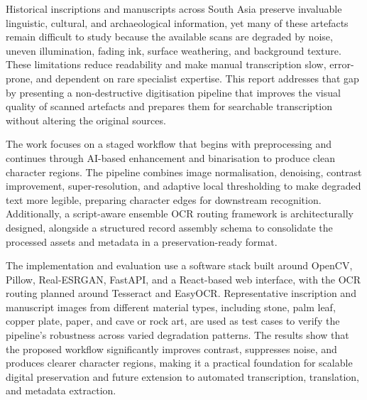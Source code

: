 \vspace{-1cm}


Historical inscriptions and manuscripts across South Asia preserve invaluable linguistic, cultural, and archaeological information, yet many of these artefacts remain difficult to study because the available scans are degraded by noise, uneven illumination, fading ink, surface weathering, and background texture. These limitations reduce readability and make manual transcription slow, error-prone, and dependent on rare specialist expertise. This report addresses that gap by presenting a non-destructive digitisation pipeline that improves the visual quality of scanned artefacts and prepares them for searchable transcription without altering the original sources.

The work focuses on a staged workflow that begins with preprocessing and continues through AI-based enhancement and binarisation to produce clean character regions. The pipeline combines image normalisation, denoising, contrast improvement, super-resolution, and adaptive local thresholding to make degraded text more legible, preparing character edges for downstream recognition. Additionally, a script-aware ensemble OCR routing framework is architecturally designed, alongside a structured record assembly schema to consolidate the processed assets and metadata in a preservation-ready format.

The implementation and evaluation use a software stack built around OpenCV, Pillow, Real-ESRGAN, FastAPI, and a React-based web interface, with the OCR routing planned around Tesseract and EasyOCR. Representative inscription and manuscript images from different material types, including stone, palm leaf, copper plate, paper, and cave or rock art, are used as test cases to verify the pipeline’s robustness across varied degradation patterns. The results show that the proposed workflow significantly improves contrast, suppresses noise, and produces clearer character regions, making it a practical foundation for scalable digital preservation and future extension to automated transcription, translation, and metadata extraction.

\pagebreak